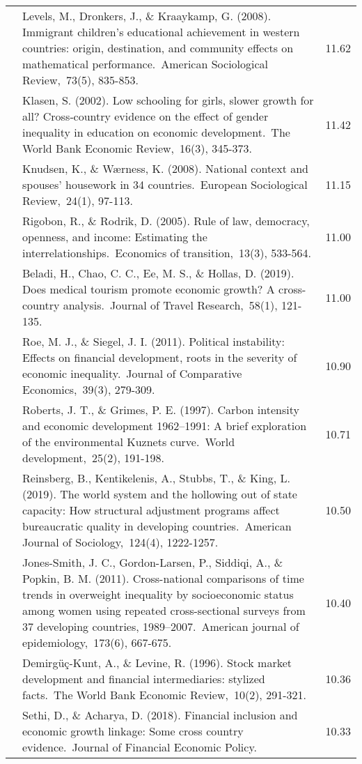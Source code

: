 \documentclass[
  man,floatsintext]{apa6}
\begin{document}
\begin{center}
\begin{ThreePartTable}
{\begin{longtable}{m{2cm}m{11cm}m{2cm}}
 & Levels, M., Dronkers, J., \& Kraaykamp, G. (2008). Immigrant children's educational achievement in western countries: origin, destination, and community effects on mathematical performance. American Sociological Review, 73(5), 835-853. & 11.62\\
 & Klasen, S. (2002). Low schooling for girls, slower growth for all? Cross‐country evidence on the effect of gender inequality in education on economic development. The World Bank Economic Review, 16(3), 345-373. & 11.42\\
 & Knudsen, K., \& Wærness, K. (2008). National context and spouses’ housework in 34 countries. European Sociological Review, 24(1), 97-113. & 11.15\\
 & Rigobon, R., \& Rodrik, D. (2005). Rule of law, democracy, openness, and income: Estimating the interrelationships. Economics of transition, 13(3), 533-564. & 11.00\\
 & Beladi, H., Chao, C. C., Ee, M. S., \& Hollas, D. (2019). Does medical tourism promote economic growth? A cross-country analysis. Journal of Travel Research, 58(1), 121-135. & 11.00\\
 & Roe, M. J., \& Siegel, J. I. (2011). Political instability: Effects on financial development, roots in the severity of economic inequality. Journal of Comparative Economics, 39(3), 279-309. & 10.90\\
 & Roberts, J. T., \& Grimes, P. E. (1997). Carbon intensity and economic development 1962–1991: A brief exploration of the environmental Kuznets curve. World development, 25(2), 191-198. & 10.71\\
 & Reinsberg, B., Kentikelenis, A., Stubbs, T., \& King, L. (2019). The world system and the hollowing out of state capacity: How structural adjustment programs affect bureaucratic quality in developing countries. American Journal of Sociology, 124(4), 1222-1257. & 10.50\\
 & Jones-Smith, J. C., Gordon-Larsen, P., Siddiqi, A., \& Popkin, B. M. (2011). Cross-national comparisons of time trends in overweight inequality by socioeconomic status among women using repeated cross-sectional surveys from 37 developing countries, 1989–2007. American journal of epidemiology, 173(6), 667-675. & 10.40\\
 & Demirgüç-Kunt, A., \& Levine, R. (1996). Stock market development and financial intermediaries: stylized facts. The World Bank Economic Review, 10(2), 291-321. & 10.36\\
 & Sethi, D., \& Acharya, D. (2018). Financial inclusion and economic growth linkage: Some cross country evidence. Journal of Financial Economic Policy. & 10.33\\
\bottomrule
\end{longtable}

}

\end{ThreePartTable}
\end{center}
\end{document}
